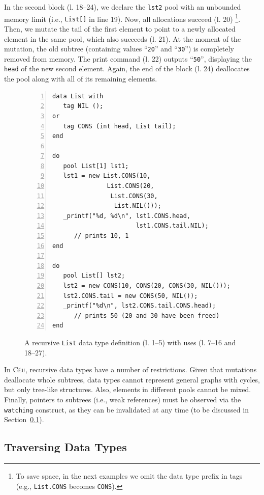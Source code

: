 \documentclass{sig-alternate}
\newcommand{\CEU}{\textsc{C\'{e}u}\xspace}
\newcommand{\code}[1] {{\small{\texttt{#1}}}}
\begin{document}
In the second block (l. 18--24), we declare the \code{lst2} pool with an 
unbounded memory limit (i.e., \code{List[]} in line 19).
Now, all allocations succeed (l. 20)%
\footnote{To save space, in the next examples we omit the data type prefix in 
tags (e.g., \code{List.CONS} becomes \code{CONS}).}.
Then, we mutate the tail of the first element to point to a newly allocated 
element in the same pool, which also succeeds (l. 21).
At the moment of the mutation, the old subtree (containing values  
``\texttt{20}'' and  ``\texttt{30}'') is completely removed from memory.
The print command (l. 22) outputs ``\texttt{50}'', displaying the \code{head}
of the new second element.
%
Again, the end of the block (l. 24) deallocates the pool along with all of its 
remaining elements.


\begin{figure}[t]
\begin{lstlisting}[numbers=left,xleftmargin=3em]
data List with
   tag NIL ();
or
   tag CONS (int head, List tail);
end

do
   pool List[1] lst1;
   lst1 = new List.CONS(10,
               List.CONS(20,
                List.CONS(30,
                 List.NIL()));
   _printf("%d, %d\n", lst1.CONS.head,
                       lst1.CONS.tail.NIL);
      // prints 10, 1
end

do
   pool List[] lst2;
   lst2 = new CONS(10, CONS(20, CONS(30, NIL()));
   lst2.CONS.tail = new CONS(50, NIL());
   _printf("%d\n", lst2.CONS.tail.CONS.head);
      // prints 50 (20 and 30 have been freed)
end
\end{lstlisting}
\caption{
A recursive \code{List} data type definition (l. 1--5) with uses (l. 
7--16 and 18--27).
\label{lst.list}
}
\end{figure}

In \CEU, recursive data types have a number of restrictions.
Given that mutations deallocate whole subtrees, data types cannot represent 
general graphs with cycles, but only tree-like structures.
Also, elements in different pools cannot be mixed.
Finally, pointers to subtrees (i.e., weak references) must be observed via the
\code{watching} construct, as they can be invalidated at any time
(to be discussed in Section~\ref{sec.traverse}).


\subsection{Traversing Data Types}
\label{sec.traverse}
\end{document}
